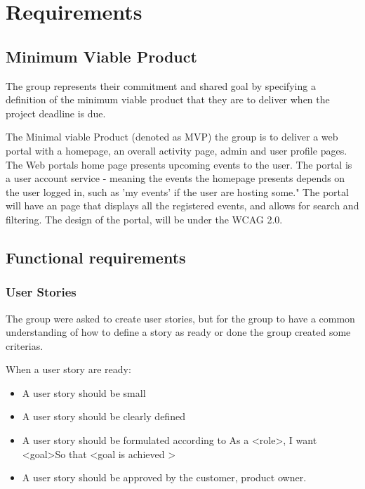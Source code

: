 
\chapter{Requirements}

\section{Minimum Viable Product}
\label{MVP}
The group represents their commitment and shared goal by specifying a definition of the minimum viable product that they are to deliver when the project deadline is due.

The Minimal viable Product (denoted as MVP) the group is to deliver a web portal with a homepage, an overall activity page, admin and user profile pages. The Web portals home page presents upcoming events to the user. The portal is a user account service - meaning the events the homepage presents depends on the user logged in, such as 'my events'  if the user are hosting some." \newline
The portal will have an page that displays all the registered events, and allows for search and filtering. 
The design of the portal, will be under the WCAG 2.0.

\section{Functional requirements}
\subsection{User Stories}
The group were asked to create user stories, but for the group to have a common understanding of how to define a story as ready or done the group created some criterias. 

\begin{description}
    \item[When a user story are ready:]
\end{description}
\begin{itemize}[noitemsep]
    \item A user story should be small
    \item A user story should be clearly defined
    \item A user story should be formulated according to As a \textless role\textgreater, I want \textless goal\textgreater So that \textless goal is achieved \textgreater
    \item A user story should be approved by the customer, product owner.
\end{itemize}

